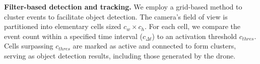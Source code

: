 
\textbf{Filter-based detection and tracking.} 
We employ a grid-based method to cluster events to facilitate object detection. 
The camera's field of view is partitioned into elementary cells sized $c_w \times c_h$. 
For each cell, we compare the event count within a specified time interval ($c_{\Delta t}$) to an activation threshold $c_{thres}$. 
Cells surpassing $c_{thres}$ are marked as active and connected to form clusters, serving as object detection results, including those generated by the drone.


